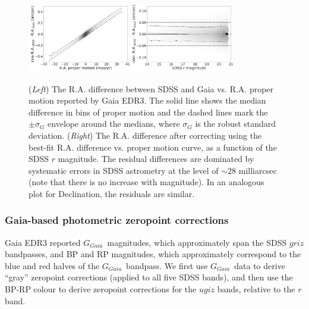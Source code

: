 \documentclass[fleqn,usenatbib]{mnras}
\newcommand{\GG}{\hbox{$G_{Gaia}$}}
\begin{document}
\begin{figure}
\centering \includegraphics[width=0.4\textwidth, keepaspectratio]{figures/astroVSpm_RA_pm_lr.png}
\centering \includegraphics[width=0.4\textwidth, keepaspectratio]{figures/astroVSpm_RA_r_lr.png}

\caption{({\it Left}) The R.A. difference between SDSS and Gaia 
vs. R.A. proper motion reported by Gaia EDR3. The solid line shows the median difference in bins 
of proper motion and the dashed lines mark the $\pm \sigma_G$ envelope around the medians,
where $\sigma_G$ is the robust standard deviation. ({\it Right}) The R.A. difference 
after correcting using the best-fit R.A. difference vs. 
proper motion curve, as a function of the SDSS $r$ magnitude. The residual differences are dominated 
by systematic errors in SDSS astrometry at the level of $\sim28$ milliarcsec (note that there is no increase with 
magnitude). In an analogous plot for Declination, the residuals are similar. 
\label{fig:GaiaRApm}}
\end{figure}


\subsubsection{Gaia-based photometric zeropoint corrections  \label{sec:GaiaCorr2}}

Gaia EDR3 reported \GG\ magnitudes, which approximately span the SDSS $griz$ bandpasses, 
and BP and RP magnitudes, which approximately correspond to the blue and red halves of the 
\GG\ bandpass. We first use \GG\ data to derive ``gray'' zeropoint corrections (applied to
all five SDSS bands), and then use the BP-RP colour to derive zeropoint corrections for the 
$ugiz$ bands, relative to the $r$ band. 
\end{document}
